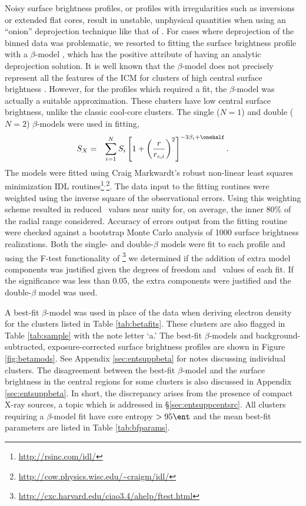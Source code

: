 Noisy surface brightness profiles, or profiles with irregularities
such as inversions or extended flat cores, result in unstable,
unphysical quantities when using an ``onion'' deprojection technique
like that of \citet{kriss83}. For cases where deprojection of the
binned data was problematic, we resorted to fitting the surface
brightness profile with a $\beta$-model \citep{betamodel}, which has
the positive attribute of having an analytic deprojection solution. It
is well known that the $\beta$-model does not precisely represent all
the features of the ICM for clusters of high central surface
brightness \citep{2000MNRAS.311..313E, 2002ApJ...579..571L,
  2007ApJ...665..911H}. However, for the profiles which required a
fit, the $\beta$-model was actually a suitable approximation. These
clusters have low central surface brightness, unlike the classic
cool-core clusters. The single ($N=1$) and double ($N=2$)
$\beta$-models were used in fitting,
\begin{eqnarray}
S_X &=& \displaystyle\sum_{i=1}^N S_i
\left[1+\left(\frac{r}{r_{c,i}}\right)^2\right]^{-3\beta_i+\onehalf}.
\end{eqnarray}
The models were fitted using Craig Markwardt's robust non-linear least
squares minimization IDL
routines\footnote{\url{http://rsinc.com/idl/}}$^{,}$\footnote{\url{http://cow.physics.wisc.edu/~craigm/idl/}}. The
data input to the fitting routines were weighted using the inverse
square of the observational errors. Using this weighting scheme
resulted in reduced \chisq\ values near unity for, on average, the
inner 80\% of the radial range considered. Accuracy of errors output
from the fitting routine were checked against a bootstrap Monte Carlo
analysis of 1000 surface brightness realizations. Both the single- and
double-$\beta$ models were fit to each profile and using the F-test
functionality of
\sherpa\footnote{\url{http://cxc.harvard.edu/ciao3.4/ahelp/ftest.html}}
we determined if the addition of extra model components was justified
given the degrees of freedom and \chisq\ values of each fit. If the
significance was less than 0.05, the extra components were justified
and the double-$\beta$ model was used.

A best-fit $\beta$-model was used in place of the data when deriving
electron density for the clusters listed in Table
\ref{tab:betafits}. These clusters are also flagged in Table
\ref{tab:sample} with the note letter `a.' The best-fit $\beta$-models
and background-subtracted, exposure-corrected surface brightness
profiles are shown in Figure \ref{fig:betamods}. See Appendix
\ref{sec:entsuppbeta} for notes discussing individual clusters. The
disagreement between the best-fit $\beta$-model and the surface
brightness in the central regions for some clusters is also discussed
in Appendix \ref{sec:entsuppbeta}. In short, the discrepancy arises from the
presence of compact X-ray sources, a topic which is addressed in
\S\ref{sec:entsuppcentsrc}. All clusters requiring a $\beta$-model fit have
core entropy $> 95 \ent$ and the mean best-fit parameters are listed
in Table \ref{tab:bfparams}.

